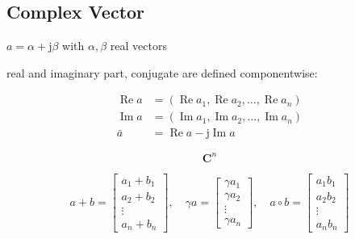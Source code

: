 \subsection{Complex Vector}

\begin{definition}
    $ a=\alpha+\mathrm{j} \beta $ with $ \alpha, \beta $ real vectors
\end{definition}

\begin{definition}
    real and imaginary part, conjugate are defined componentwise:

\begin{equation}
\begin{aligned}
\operatorname{Re} a &=\left(\operatorname{Re} a_{1}, \operatorname{Re} a_{2}, \ldots, \operatorname{Re} a_{n}\right) \\
\operatorname{Im} a &=\left(\operatorname{Im} a_{1}, \operatorname{Im} a_{2}, \ldots, \operatorname{Im} a_{n}\right) \\
\bar{a} &=\operatorname{Re} a-\mathrm{j} \operatorname{Im} a
\end{aligned}
\end{equation}
\end{definition}

\begin{definition}
    \begin{equation} \mathbf{C}^{n} \end{equation}
\end{definition}

\begin{definition}
    \begin{equation} a+b=\left[\begin{array}{c}a_{1}+b_{1} \\ a_{2}+b_{2} \\ \vdots \\ a_{n}+b_{n}\end{array}\right], \quad \gamma a=\left[\begin{array}{c}\gamma a_{1} \\ \gamma a_{2} \\ \vdots \\ \gamma a_{n}\end{array}\right], \quad a \circ b=\left[\begin{array}{c}a_{1} b_{1} \\ a_{2} b_{2} \\ \vdots \\ a_{n} b_{n}\end{array}\right] \end{equation}
\end{definition}

